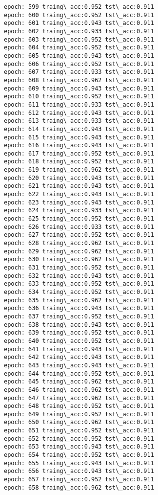 \documentclass[11pt]{article}
\begin{document}
\begin{Verbatim}[commandchars=\\\{\}]
epoch: 599 traing\_acc:0.952 tst\_acc:0.911
epoch: 600 traing\_acc:0.952 tst\_acc:0.911
epoch: 601 traing\_acc:0.943 tst\_acc:0.911
epoch: 602 traing\_acc:0.933 tst\_acc:0.911
epoch: 603 traing\_acc:0.952 tst\_acc:0.911
epoch: 604 traing\_acc:0.952 tst\_acc:0.911
epoch: 605 traing\_acc:0.943 tst\_acc:0.911
epoch: 606 traing\_acc:0.952 tst\_acc:0.911
epoch: 607 traing\_acc:0.933 tst\_acc:0.911
epoch: 608 traing\_acc:0.962 tst\_acc:0.911
epoch: 609 traing\_acc:0.943 tst\_acc:0.911
epoch: 610 traing\_acc:0.952 tst\_acc:0.911
epoch: 611 traing\_acc:0.933 tst\_acc:0.911
epoch: 612 traing\_acc:0.943 tst\_acc:0.911
epoch: 613 traing\_acc:0.933 tst\_acc:0.911
epoch: 614 traing\_acc:0.943 tst\_acc:0.911
epoch: 615 traing\_acc:0.943 tst\_acc:0.911
epoch: 616 traing\_acc:0.943 tst\_acc:0.911
epoch: 617 traing\_acc:0.952 tst\_acc:0.911
epoch: 618 traing\_acc:0.952 tst\_acc:0.911
epoch: 619 traing\_acc:0.962 tst\_acc:0.911
epoch: 620 traing\_acc:0.943 tst\_acc:0.911
epoch: 621 traing\_acc:0.943 tst\_acc:0.911
epoch: 622 traing\_acc:0.943 tst\_acc:0.911
epoch: 623 traing\_acc:0.943 tst\_acc:0.911
epoch: 624 traing\_acc:0.933 tst\_acc:0.911
epoch: 625 traing\_acc:0.952 tst\_acc:0.911
epoch: 626 traing\_acc:0.933 tst\_acc:0.911
epoch: 627 traing\_acc:0.952 tst\_acc:0.911
epoch: 628 traing\_acc:0.962 tst\_acc:0.911
epoch: 629 traing\_acc:0.962 tst\_acc:0.911
epoch: 630 traing\_acc:0.962 tst\_acc:0.911
epoch: 631 traing\_acc:0.952 tst\_acc:0.911
epoch: 632 traing\_acc:0.943 tst\_acc:0.911
epoch: 633 traing\_acc:0.952 tst\_acc:0.911
epoch: 634 traing\_acc:0.952 tst\_acc:0.911
epoch: 635 traing\_acc:0.962 tst\_acc:0.911
epoch: 636 traing\_acc:0.943 tst\_acc:0.911
epoch: 637 traing\_acc:0.952 tst\_acc:0.911
epoch: 638 traing\_acc:0.943 tst\_acc:0.911
epoch: 639 traing\_acc:0.952 tst\_acc:0.911
epoch: 640 traing\_acc:0.952 tst\_acc:0.911
epoch: 641 traing\_acc:0.943 tst\_acc:0.911
epoch: 642 traing\_acc:0.943 tst\_acc:0.911
epoch: 643 traing\_acc:0.943 tst\_acc:0.911
epoch: 644 traing\_acc:0.952 tst\_acc:0.911
epoch: 645 traing\_acc:0.962 tst\_acc:0.911
epoch: 646 traing\_acc:0.962 tst\_acc:0.911
epoch: 647 traing\_acc:0.962 tst\_acc:0.911
epoch: 648 traing\_acc:0.952 tst\_acc:0.911
epoch: 649 traing\_acc:0.952 tst\_acc:0.911
epoch: 650 traing\_acc:0.962 tst\_acc:0.911
epoch: 651 traing\_acc:0.952 tst\_acc:0.911
epoch: 652 traing\_acc:0.952 tst\_acc:0.911
epoch: 653 traing\_acc:0.943 tst\_acc:0.911
epoch: 654 traing\_acc:0.952 tst\_acc:0.911
epoch: 655 traing\_acc:0.943 tst\_acc:0.911
epoch: 656 traing\_acc:0.943 tst\_acc:0.911
epoch: 657 traing\_acc:0.952 tst\_acc:0.911
epoch: 658 traing\_acc:0.962 tst\_acc:0.911

\end{Verbatim}
\end{document}
